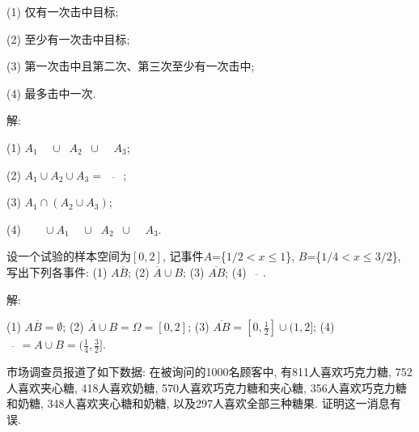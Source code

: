 \documentclass[standard]{ExBook}
\renewenvironment{shaded}{%
  \def\FrameCommand{\fboxsep=\FrameSep \colorbox{shadecolor}}%
  \MakeFramed{\advance\hsize-\width \FrameRestore}%
}{%
  \endMakeFramed
}
\begin{document}
\begin{qitems}
\begin{bbox}
\begin{shaded}
(1) 仅有一次击中目标;

(2) 至少有一次击中目标;

(3) 第一次击中且第二次、第三次至少有一次击中;

(4) 最多击中一次.
    \end{shaded}
    \end{bbox}

\vspace{\dimexpr2.5cm-5em\relax}

解: 

(1) $A_{1}\mathop{\overline{A_{2}}}\mathop{\overline{A_{3}}}\cup\mathop{\overline{A_{1}}}A_{2}\mathop{\overline{A_{3}}}\cup\mathop{\overline{A_{1}}}\mathop{\overline{A_{2}}}A_{3}$;

(2) $A_{1}\cup A_{2}\cup A_{3}=\overline{\mathop{\overline{A_{1}}}\mathop{\overline{A_{2}}}\mathop{\overline{A_{3}}}}$;

(3) $A_{1}\cap(A_{2}\cup A_{3})$;

(4) $\mathop{\overline{A_{1}}}\mathop{\overline{A_{2}}}\mathop{\overline{A_{3}}}\cup A_{1}\mathop{\overline{A_{2}}}\mathop{\overline{A_{3}}}\cup \mathop{\overline{A_{1}}}A_{2}\mathop{\overline{A_{3}}}\cup\mathop{\overline{A_{1}}}\mathop{\overline{A_{2}}}A_{3}$.

\vspace{2.5cm-5em}

    \begin{bbox}
    \begin{shaded}
        \qitem
设一个试验的样本空间为$[0,2]$, 记事件$A$=\{$1/2 < x \leq 1$\}, $B$=\{$1/4 < x \leq 3/2$\}, 写出下列各事件:
(1) $A\overline{B}$;\qquad
(2) $\overline{A}\cup B$;\qquad
(3) $\overline{AB}$;\qquad
(4) $\overline{\mathop{\overline{A}}\mathop{\overline{B}}}$.
    \end{shaded}
    \end{bbox}

\vspace{\dimexpr2.5cm-5em\relax}

解:

(1) $A\overline{B}=\emptyset$;\qquad
(2) $\overline{A}\cup B=\Omega=[0,2]$;\qquad
(3) $\overline{AB}=[0,\frac{1}{2}]\cup(1,2]$;\qquad
(4) $\overline{\mathop{\overline{A}}\mathop{\overline{B}}}=A\cup B=(\frac{1}{4},\frac{3}{2}]$.

\vspace{2.5cm-5em}

    \begin{bbox}
    \begin{shaded}
        \qitem
市场调查员报道了如下数据: 在被询问的1000名顾客中, 有811人喜欢巧克力糖, 752人喜欢夹心糖, 418人喜欢奶糖, 570人喜欢巧克力糖和夹心糖, 356人喜欢巧克力糖和奶糖, 348人喜欢夹心糖和奶糖, 以及297人喜欢全部三种糖果. 证明这一消息有误.
    \end{shaded}
    \end{bbox}


\end{qitems}
\end{document}
